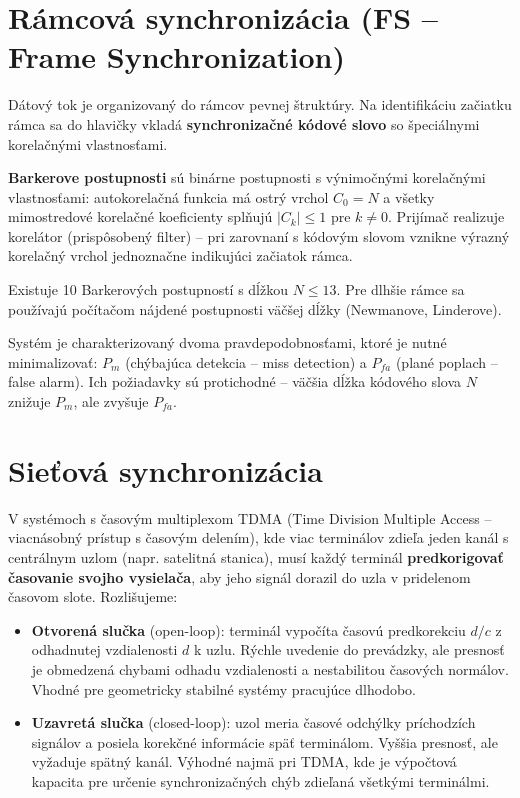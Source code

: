 \section{Rámcová synchronizácia (FS -- Frame Synchronization)}

Dátový tok je organizovaný do rámcov pevnej štruktúry. Na identifikáciu začiatku
rámca sa do hlavičky vkladá \textbf{synchronizačné kódové slovo} so špeciálnymi
korelačnými vlastnosťami.

\textbf{Barkerove postupnosti} sú binárne postupnosti s výnimočnými korelačnými
vlastnosťami: autokorelačná funkcia má ostrý vrchol $C_0 = N$ a všetky
mimostredové korelačné koeficienty splňujú $|C_k| \leq 1$ pre $k \neq 0$.
Prijímač realizuje korelátor (prispôsobený filter) -- pri zarovnaní s kódovým
slovom vznikne výrazný korelačný vrchol jednoznačne indikujúci začiatok rámca.

Existuje 10 Barkerových postupností s dĺžkou $N \leq 13$. Pre dlhšie rámce
sa používajú počítačom nájdené postupnosti väčšej dĺžky (Newmanove, Linderove).

Systém je charakterizovaný dvoma pravdepodobnosťami, ktoré je nutné minimalizovať:
$P_m$ (chýbajúca detekcia -- miss detection) a $P_{fa}$ (plané poplach -- false alarm).
Ich požiadavky sú protichodné -- väčšia dĺžka kódového slova $N$ znižuje $P_m$,
ale zvyšuje $P_{fa}$.

\section{Sieťová synchronizácia}

V systémoch s časovým multiplexom TDMA (Time Division Multiple Access -- viacnásobný
prístup s časovým delením), kde viac terminálov zdieľa jeden kanál s centrálnym
uzlom (napr. satelitná stanica), musí každý terminál \textbf{predkorigovať časovanie
svojho vysielača}, aby jeho signál dorazil do uzla v pridelenom časovom slote.
Rozlišujeme:

\begin{itemize}
    \item \textbf{Otvorená slučka} (open-loop): terminál vypočíta časovú
        predkorekciu $d/c$ z odhadnutej vzdialenosti $d$ k uzlu. Rýchle uvedenie
        do prevádzky, ale presnosť je obmedzená chybami odhadu vzdialenosti
        a nestabilitou časových normálov. Vhodné pre geometricky stabilné
        systémy pracujúce dlhodobo.
    \item \textbf{Uzavretá slučka} (closed-loop): uzol meria časové odchýlky
        príchodzích signálov a posiela korekčné informácie späť terminálom.
        Vyššia presnosť, ale vyžaduje spätný kanál. Výhodné najmä pri TDMA,
        kde je výpočtová kapacita pre určenie synchronizačných chýb zdieľaná
        všetkými terminálmi.
\end{itemize}